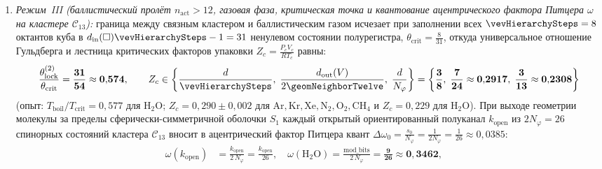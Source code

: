 \begin{theorem}[Классификация четырёх элементарных механизмов химических реакций по каналам $(V,E,\triangle,\square)$ и закон $8 = 3 + 2 + 3$ ферментативного катализа]
\begin{enumerate}[leftmargin=*]
\begin{enumerate}[label=(\roman*),leftmargin=*,noitemsep]
    \begin{equation}
    \label{eq:bio-trouton-vaporization-invariants}
      \Sigma_{\mathrm{II\to III}}^{(\mathrm{assoc})} = \frac{d-1}{4/27} = \frac{d^3}{d_{\mathrm{in}}(E)} = \mathbf{\frac{27}{2} = 13{,}5},\qquad
      \Sigma_{\mathrm{II\to III}}^{(\mathrm{iso})} = \frac{27}{2} - d = \mathbf{\frac{21}{2} = 10{,}5}
    \end{equation}
    (опыт $\Delta S_{\mathrm{vap}}/R\colon$ вода и спирты $13{,}1\text{--}13{,}5$, простые жидкости $10{,}5$);
  \item \emph{Режим~III (баллистический пролёт $n_{\mathrm{act}} > 12$, газовая фаза, критическая точка и квантование ацентрического фактора Питцера $\omega$ на кластере $\mathcal{C}_{13}$):} граница между связным кластером и баллистическим газом исчезает при заполнении всех $\vevHierarchySteps = 8$ октантов куба в $d_{\mathrm{in}}(\square)\vevHierarchySteps - 1 = 31$ ненулевом состоянии полурегистра, $\theta_{\mathrm{crit}} = \frac{8}{31}$, откуда универсальное отношение Гульдберга и лестница критических факторов упаковки $Z_c = \frac{P_c V_c}{R T_c}$ равны:
    \begin{equation}
    \label{eq:bio-guldberg-and-critical-z}
      \frac{\theta_{\mathrm{lock}}^{(2)}}{\theta_{\mathrm{crit}}} = \mathbf{\frac{31}{54} \approx 0{,}574},\qquad
      Z_c \in \left\{\frac{d}{\vevHierarchySteps},\; \frac{d_{\mathrm{out}}(V)}{2\geomNeighborTwelve},\; \frac{d}{N_\varphi}\right\}
      = \left\{\mathbf{\frac{3}{8}},\; \mathbf{\frac{7}{24} \approx 0{,}2917},\; \mathbf{\frac{3}{13} \approx 0{,}2308}\right\}
    \end{equation}
    (опыт: $T_{\mathrm{boil}}/T_{\mathrm{crit}} = 0{,}577$ для $\mathrm{H_2O}$; $Z_c = 0{,}290\pm 0{,}002$ для $\mathrm{Ar, Kr, Xe, N_2, O_2, CH_4}$ и $Z_c = 0{,}229$ для $\mathrm{H_2O}$).
    При выходе геометрии молекулы за пределы сферически-симметричной оболочки $S_1$ каждый открытый ориентированный полуканал $k_{\mathrm{open}}$ из $2 N_\varphi = 26$ спинорных состояний кластера $\mathcal{C}_{13}$ вносит в ацентрический фактор Питцера квант $\Delta\omega_0 = \frac{s_0}{N_\varphi} = \frac{1}{2N_\varphi} = \frac{1}{26} \approx 0{,}0385$:
    \begin{equation}
    \label{eq:bio-pitzer-acentric-and-lee-kesler}
    \begin{aligned}
      \omega(k_{\mathrm{open}}) &= \frac{k_{\mathrm{open}}}{2\,N_\varphi} = \frac{k_{\mathrm{open}}}{26},\quad
      \omega(\mathrm{H_2O}) = \frac{\mathrm{mod\_bits}}{2\,N_\varphi} = \mathbf{\frac{9}{26} \approx 0{,}3462},\quad

\end{aligned}
\end{equation}
\end{enumerate}
\end{enumerate}
\end{theorem}
